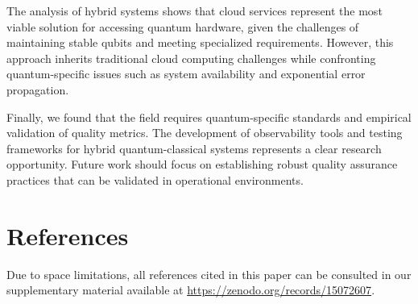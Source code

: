 The analysis of hybrid systems shows that cloud services represent the most viable solution for accessing quantum hardware, given the challenges of maintaining stable qubits and meeting specialized requirements. However, this approach inherits traditional cloud computing challenges while confronting quantum-specific issues such as system availability and exponential error propagation.

Finally, we found that the field requires quantum-specific standards and empirical validation of quality metrics. The development of observability tools and testing frameworks for hybrid quantum-classical systems represents a clear research opportunity. Future work should focus on establishing robust quality assurance practices that can be validated in operational environments.

\section{References}

Due to space limitations, all references cited in this paper can be consulted in our supplementary material available at \url{https://zenodo.org/records/15072607}.

\newpage